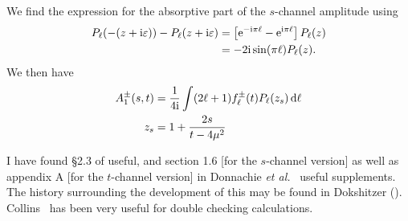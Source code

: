 \M We find the expression for the absorptive part of the $s$-channel
amplitude using
\begin{subequations}
\begin{align}
P_{\ell}(-(z+\mathrm{i}\varepsilon))-P_{\ell}(z+\mathrm{i}\varepsilon)
&= \left[\mathrm{e}^{-\mathrm{i}\pi\ell}-\mathrm{e}^{\mathrm{i}\pi\ell}\right]P_{\ell}(z)\\
&=-2\mathrm{i}\sin(\pi\ell)P_{\ell}(z).
\end{align}
\end{subequations}
We then have
\begin{subequations}
\begin{align}
A^{\pm}_{1}(s,t) &= \frac{1}{4\mathrm{i}}\int(2\ell+1)f^{\pm}_{\ell}(t)P_{\ell}(z_{s})\,\mathrm{d}\ell\\
z_{s} &= 1 + \frac{2s}{t-4\mu^{2}}
\end{align}
\end{subequations}

I have found \S2.3 of  useful, and section 1.6 [for
the $s$-channel version] as well
as appendix A [for the $t$-channel version] in Donnachie \textit{et al.}~\cite{Donnachie:2002en}
useful supplements. The history surrounding the development of this may
be found in Dokshitzer ().
Collins~\cite{Collins:1977jy} has been very useful for double checking
calculations. 